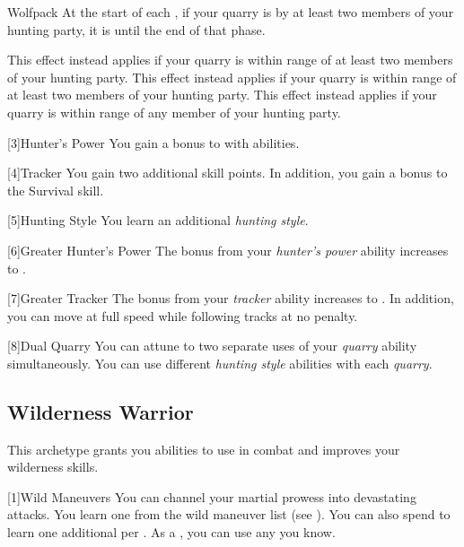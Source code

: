 {            \begin{freeability}{Wolfpack}
                At the start of each , if your quarry is  by at least two members of your hunting party, it is  until the end of that phase.

                \rankline
                 This effect instead applies if your quarry is within \rngmed range of at least two members of your hunting party.
                 This effect instead applies if your quarry is within \rnglong range of at least two members of your hunting party.
                 This effect instead applies if your quarry is within \rnglong range of any member of your hunting party.
            \end{freeability}
        }

        [3]{Hunter's Power} You gain a  bonus to  with  abilities.

        [4]{Tracker} You gain two additional skill points.
        In addition, you gain a  bonus to the Survival skill.

        [5]{Hunting Style}
        You learn an additional \textit{hunting style}.

        [6]{Greater Hunter's Power}
        The bonus from your \textit{hunter's power} ability increases to .

        [7]{Greater Tracker} The bonus from your \textit{tracker} ability increases to .
        In addition, you can move at full speed while following tracks at no penalty.

        [8]{Dual Quarry} You can attune to two separate uses of your \textit{quarry} ability simultaneously.
        You can use different \textit{hunting style} abilities with each \textit{quarry}.

    \subsection{Wilderness Warrior}
        This archetype grants you abilities to use in combat and improves your wilderness skills.

        [1]{Wild Maneuvers} 
        You can channel your martial prowess into devastating attacks.
        You learn one  from the wild maneuver list (see ).
        You can also spend  to learn one additional  per .
        As a , you can use any  you know.

